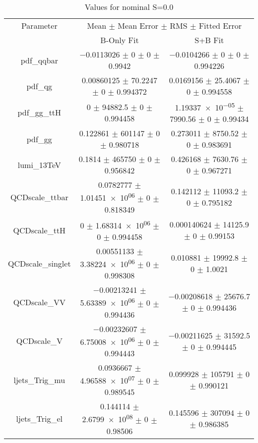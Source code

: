 \begin{table}
\centering
\caption{Values for nominal S=0.0}
\begin{tabular}{ccc}
\toprule
Parameter & \multicolumn{2}{c}{Mean $\pm$ Mean Error $\pm$ RMS $\pm$ Fitted Error}\\
 & B-Only Fit & S+B Fit\\
\midrule
pdf\_qqbar & \num{-0.0113026} $\pm$ \num{0} $\pm$ \num{0} $\pm$ \num{0.9942} & \num{-0.0104266} $\pm$ \num{0} $\pm$ \num{0} $\pm$ \num{0.994226}\\
pdf\_qg & \num{0.00860125} $\pm$ \num{70.2247} $\pm$ \num{0} $\pm$ \num{0.994372} & \num{0.0169156} $\pm$ \num{25.4067} $\pm$ \num{0} $\pm$ \num{0.994558}\\
pdf\_gg\_ttH & \num{0} $\pm$ \num{94882.5} $\pm$ \num{0} $\pm$ \num{0.994458} & \num{1.19337e-05} $\pm$ \num{7990.56} $\pm$ \num{0} $\pm$ \num{0.99434}\\
pdf\_gg & \num{0.122861} $\pm$ \num{601147} $\pm$ \num{0} $\pm$ \num{0.980718} & \num{0.273011} $\pm$ \num{8750.52} $\pm$ \num{0} $\pm$ \num{0.983691}\\
lumi\_13TeV & \num{0.1814} $\pm$ \num{465750} $\pm$ \num{0} $\pm$ \num{0.956842} & \num{0.426168} $\pm$ \num{7630.76} $\pm$ \num{0} $\pm$ \num{0.967271}\\
QCDscale\_ttbar & \num{0.0782777} $\pm$ \num{1.01451e+06} $\pm$ \num{0} $\pm$ \num{0.818349} & \num{0.142112} $\pm$ \num{11093.2} $\pm$ \num{0} $\pm$ \num{0.795182}\\
QCDscale\_ttH & \num{0} $\pm$ \num{1.68314e+06} $\pm$ \num{0} $\pm$ \num{0.994458} & \num{0.000140624} $\pm$ \num{14125.9} $\pm$ \num{0} $\pm$ \num{0.99153}\\
QCDscale\_singlet & \num{0.00551133} $\pm$ \num{3.38224e+06} $\pm$ \num{0} $\pm$ \num{0.998308} & \num{0.010881} $\pm$ \num{19992.8} $\pm$ \num{0} $\pm$ \num{1.0021}\\
QCDscale\_VV & \num{-0.00213241} $\pm$ \num{5.63389e+06} $\pm$ \num{0} $\pm$ \num{0.994436} & \num{-0.00208618} $\pm$ \num{25676.7} $\pm$ \num{0} $\pm$ \num{0.994436}\\
QCDscale\_V & \num{-0.00232607} $\pm$ \num{6.75008e+06} $\pm$ \num{0} $\pm$ \num{0.994443} & \num{-0.00211625} $\pm$ \num{31592.5} $\pm$ \num{0} $\pm$ \num{0.994445}\\
ljets\_Trig\_mu & \num{0.0936667} $\pm$ \num{4.96588e+07} $\pm$ \num{0} $\pm$ \num{0.989545} & \num{0.099928} $\pm$ \num{105791} $\pm$ \num{0} $\pm$ \num{0.990121}\\
ljets\_Trig\_el & \num{0.144114} $\pm$ \num{2.6799e+08} $\pm$ \num{0} $\pm$ \num{0.98506} & \num{0.145596} $\pm$ \num{307094} $\pm$ \num{0} $\pm$ \num{0.986385}\\

\end{tabular}
\end{table}
